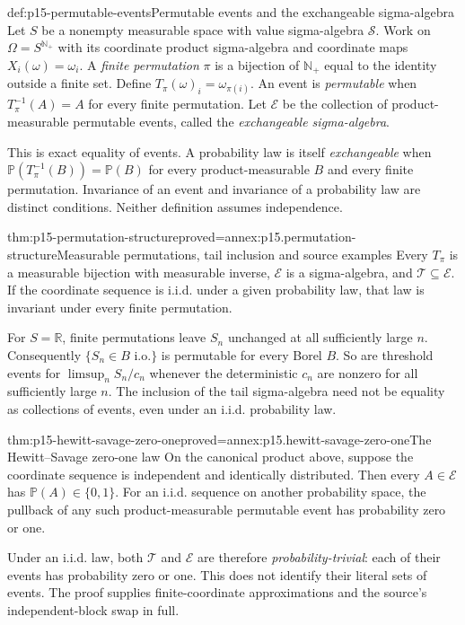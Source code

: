 \begin{hbdefinition}{def:p15-permutable-events}{Permutable events and the exchangeable sigma-algebra}
Let \(S\) be a nonempty measurable space with value sigma-algebra
\(\mathcal S\). Work on \(\Omega=S^{\mathbb N_+}\) with its
coordinate product sigma-algebra and coordinate maps \(X_i(\omega)=\omega_i\).
A \emph{finite permutation} \(\pi\) is a bijection of
\(\mathbb N_+\) equal to the identity outside a finite set. Define
\(T_\pi(\omega)_i=\omega_{\pi(i)}\).
An event is \emph{permutable} when
\(T_\pi^{-1}(A)=A\) for every finite permutation. Let
\(\mathcal E\) be the collection of product-measurable permutable
events, called the \emph{exchangeable sigma-algebra}.

This is exact equality of events. A probability law is itself
\emph{exchangeable} when \(\mathbb P(T_\pi^{-1}(B))=\mathbb P(B)\)
for every product-measurable \(B\) and every finite permutation.
Invariance of an event and invariance of a probability law are distinct
conditions. Neither definition assumes independence.
\end{hbdefinition}

\begin{hbtheorem}{thm:p15-permutation-structure}{proved=annex:p15.permutation-structure}{Measurable permutations, tail inclusion and source examples}
Every \(T_\pi\) is a measurable bijection with measurable inverse,
\(\mathcal E\) is a sigma-algebra, and \(\mathcal T\subseteq\mathcal E\).
If the coordinate sequence is i.i.d. under a given probability law,
that law is invariant under every finite permutation.

For \(S=\mathbb R\), finite permutations leave \(S_n\)
unchanged at all sufficiently large \(n\). Consequently
\(\{S_n\in B\text{ i.o.}\}\) is permutable for every Borel \(B\).
So are threshold events for \(\limsup_n S_n/c_n\) whenever the
deterministic \(c_n\) are nonzero for all sufficiently large \(n\).
The inclusion of the tail sigma-algebra need not be equality as
collections of events, even under an i.i.d. probability law.
\end{hbtheorem}

\begin{hbtheorem}{thm:p15-hewitt-savage-zero-one}{proved=annex:p15.hewitt-savage-zero-one}{The Hewitt--Savage zero-one law}
On the canonical product above, suppose the coordinate sequence is
independent and identically distributed. Then every
\(A\in\mathcal E\) has \(\mathbb P(A)\in\{0,1\}\).
For an i.i.d. sequence on another probability space, the pullback of
any such product-measurable permutable event has probability zero or one.

Under an i.i.d. law, both \(\mathcal T\) and \(\mathcal E\)
are therefore \emph{probability-trivial}: each of their events has
probability zero or one. This does not identify their literal sets
of events. The proof supplies finite-coordinate approximations and
the source's independent-block swap in full.
\end{hbtheorem}

